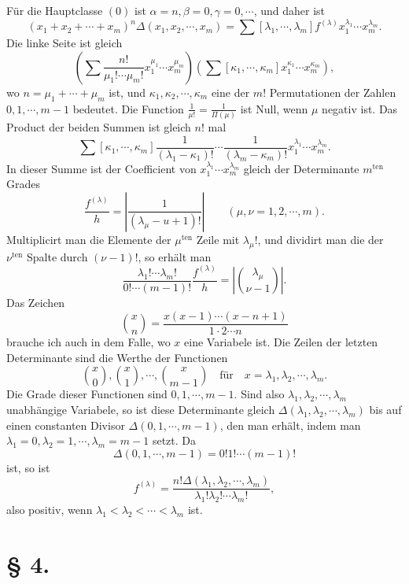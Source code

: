 \documentclass[11pt]{article}
\newcommand{\ten}{\mathrm{ten}}
\begin{document}
Für die Hauptclasse $(0)$ ist $\alpha=n,\beta=0,\gamma=0,\cdots$, und daher ist
\begin{equation}\tag{5.}
 (x_1+x_2+\cdots+x_m)^n\Delta(x_1,x_2,\cdots,x_m)=\sum[\lambda_1,\cdots,
\lambda_m]f^{(\lambda)}x_1^{\lambda_1}\cdots x_m^{\lambda_m}.
\end{equation}
Die linke Seite ist gleich
\[
 \left(\sum \frac{n!}{\mu_1!\cdots\mu_m!}x_1^{\mu_1}\cdots x_m^{\mu_m}\right)
 \left(\sum[\kappa_1,\cdots,
\kappa_m]x_1^{\kappa_1}\cdots x_m^{\kappa_m}\right),
\]
wo $n=\mu_1+\cdots+
\mu_m$ ist, und $\kappa_1,
\kappa_2,
\cdots,
\kappa_m$ eine der $m!$ Permutationen der Zahlen $0,1,
\cdots,m-1$ bedeutet. Die Function $\frac{1}{\mu!}=\frac{1}{\Pi(\mu)}$ ist Null, wenn $\mu$ negativ ist. Das Product der beiden Summen ist gleich $n!$ mal
\[
 \sum[\kappa_1,
\cdots,
\kappa_m]\frac{1}{(\lambda_1-
\kappa_1)!}\cdots\frac{1}{(\lambda_m-
\kappa_m)!}x_1^{\lambda_1}\cdots x_m^{\lambda_m}.
\]
In dieser Summe ist der Coefficient von $x_1^{\lambda_1}\cdots x_m^{\lambda_m}$ gleich der Determinante $m^{\ten}$ Grades
\[
 \frac{f^{(\lambda)}}{h}=\left|\frac{1}{(\lambda_\mu-
u+1)!}\right|\qquad(\mu,
\nu=1,2,
\cdots,m).
\]
Multiplicirt man die Elemente der $\mu^{\ten}$ Zeile mit $\lambda_\mu!$, und dividirt man die der $\nu^{\ten}$ Spalte durch $(\nu-1)!$, so erhält man
\[
 \frac{\lambda_1!\cdots\lambda_m!}{0!\cdots(m-1)!}\frac{f^{(\lambda)}}{h}=\left|\binom{\lambda_\mu}{\nu-1}\right|.
\]
Das Zeichen
\[
 \binom{x}{n}=\frac{x(x-1)\cdots(x-n+1)}{1\cdot2\cdots n}
\]
brauche ich auch in dem Falle, wo $x$ eine Variabele ist. Die Zeilen der letzten Determinante sind die Werthe der Functionen
\[
 \binom{x}{0},\binom{x}{1},\cdots,\binom{x}{m-1}\quad\text{für}\quad x=\lambda_1,\lambda_2,\cdots,
\lambda_m.
\]
Die Grade dieser Functionen sind $0,1,
\cdots,m-1$. Sind also $\lambda_1,
\lambda_2,
\cdots,
\lambda_m$ unabhängige Variabele, so ist diese Determinante gleich $\Delta(\lambda_1,
\lambda_2,
\cdots,
\lambda_m)$ bis auf einen constanten Divisor $\Delta(0,1,
\cdots,m-1)$, den man erhält, indem man $\lambda_1=0,
\lambda_2=1,
\cdots,
\lambda_m=m-1$ setzt. Da
\[
 \Delta(0,1,
\cdots,m-1)=0!1!\cdots(m-1)!
\]
ist, so ist
\begin{equation}\tag{6.}
 f^{(\lambda)}=\frac{n!\Delta(\lambda_1,
\lambda_2,
\cdots,
\lambda_m)}{\lambda_1!\lambda_2!\cdots\lambda_m!},
\end{equation}
also positiv, wenn $\lambda_1<\lambda_2<\cdots<\lambda_m$ ist.

\section*{§ 4.}
\end{document}
